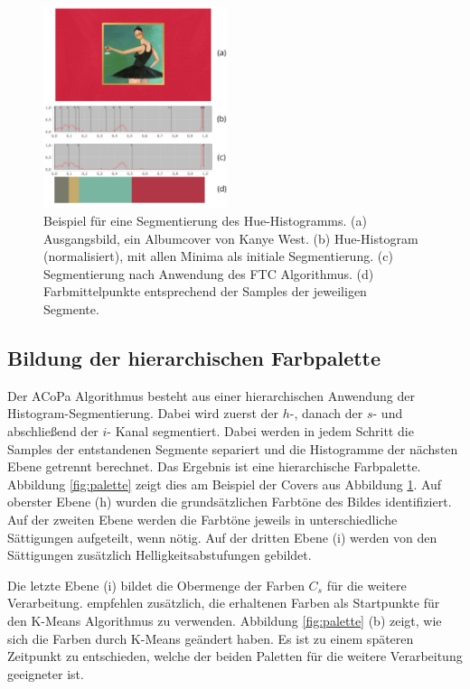 \documentclass[11pt,a4paper,bibliography=totoc,twocolumn]{scrartcl}
\begin{document}
\begin{figure}[h]
\centering
\includegraphics[width=0.48\textwidth]{img/h_segmentation.png}
\caption{Beispiel für eine Segmentierung des Hue-Histogramms. (a) Ausgangsbild, ein Albumcover  von Kanye West. (b) Hue-Histogram (normalisiert), mit allen Minima als initiale Segmentierung. (c) Segmentierung nach Anwendung des FTC Algorithmus. (d) Farbmittelpunkte entsprechend der Samples der jeweiligen Segmente.}
\label{fig:h_segmentation}
\end{figure}

\subsection{Bildung der hierarchischen Farbpalette}

Der ACoPa Algorithmus besteht aus einer hierarchischen Anwendung der Histogram-Segmentierung. Dabei wird zuerst der $h$-, danach der $s$- und abschließend der $i$- Kanal segmentiert. Dabei werden in jedem Schritt die Samples der entstandenen Segmente separiert und die Histogramme der nächsten Ebene getrennt berechnet. Das Ergebnis ist eine hierarchische Farbpalette. Abbildung \ref{fig:palette} zeigt dies am Beispiel der Covers aus Abbildung \ref{fig:h_segmentation}. Auf oberster Ebene (h) wurden die grundsätzlichen Farbtöne des Bildes identifiziert. Auf der zweiten Ebene werden die Farbtöne jeweils in unterschiedliche Sättigungen aufgeteilt, wenn nötig. Auf der dritten Ebene (i) werden von den Sättigungen zusätzlich Helligkeitsabstufungen gebildet.

Die letzte Ebene (i) bildet die Obermenge der Farben $C_s$ für die weitere Verarbeitung. \citet{acopa} empfehlen zusätzlich, die erhaltenen Farben als Startpunkte für den K-Means Algorithmus zu verwenden. Abbildung \ref{fig:palette} (b) zeigt, wie sich die Farben durch K-Means geändert haben. Es ist zu einem späteren Zeitpunkt zu entschieden, welche der beiden Paletten für die weitere Verarbeitung geeigneter ist.
\end{document}
